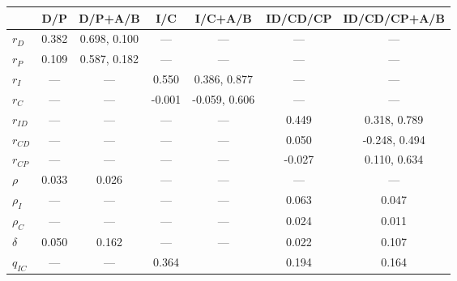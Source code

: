 \begin{supptable}
    \begin{center}
    \begin{tabular}{lcccccc}
                       & D/P   & D/P+A/B      & I/C    & I/C+A/B      & ID/CD/CP & ID/CD/CP+A/B \\ \midrule
        $r_D$          & 0.382 & 0.698, 0.100 & ---    & ---          & ---      & ---          \\
        $r_P$          & 0.109 & 0.587, 0.182 & ---    & ---          & ---      & ---          \\
        $r_I$          & ---   & ---          & 0.550  & 0.386, 0.877 & ---      & ---          \\
        $r_C$          & ---   & ---          &-0.001  &-0.059, 0.606 & ---      & ---          \\
        $r_{ID}$       & ---   & ---          & ---    & ---          & 0.449    & 0.318, 0.789 \\
        $r_{CD}$       & ---   & ---          & ---    & ---          & 0.050    &-0.248, 0.494 \\
        $r_{CP}$       & ---   & ---          & ---    & ---          &-0.027    & 0.110, 0.634 \\
        $\rho$         & 0.033 & 0.026        & ---    & ---          & ---      & ---          \\
        $\rho_I$       & ---   & ---          & ---    & ---          & 0.063    & 0.047        \\
        $\rho_C$       & ---   & ---          & ---    & ---          & 0.024    & 0.011        \\
        $\delta$       & 0.050 & 0.162        & ---    & ---          & 0.022    & 0.107        \\
        $q_{IC}$       & ---   & ---          & 0.364  &              & 0.194    & 0.164        
    \end{tabular}


\end{center}
\end{supptable}
